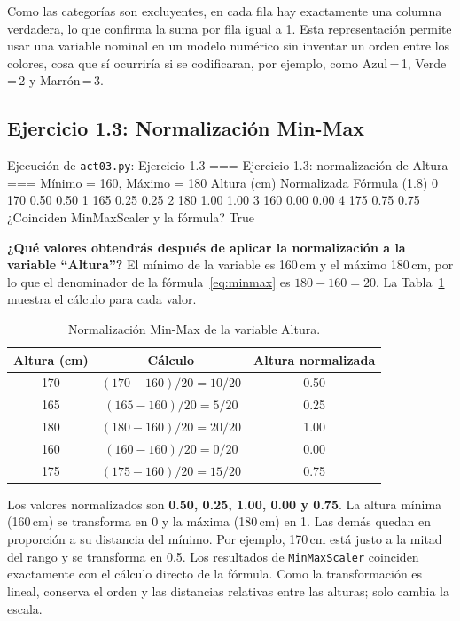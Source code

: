 \documentclass[11pt,letterpaper]{article}
\begin{document}
Como las categorías son excluyentes, en cada fila hay exactamente una columna verdadera, lo que confirma la suma por fila igual a 1. Esta representación permite usar una variable nominal en un modelo numérico sin inventar un orden entre los colores, cosa que sí ocurriría si se codificaran, por ejemplo, como Azul\,=\,1, Verde\,=\,2 y Marrón\,=\,3.

\subsection{Ejercicio 1.3: Normalización Min-Max}

\begin{consola}[label=out:ej13]{Ejecución de \texttt{act03.py}: Ejercicio 1.3}
=== Ejercicio 1.3: normalización de Altura ===
Mínimo = 160, Máximo = 180
   Altura (cm)  Normalizada  Fórmula (1.8)
0          170         0.50           0.50
1          165         0.25           0.25
2          180         1.00           1.00
3          160         0.00           0.00
4          175         0.75           0.75
¿Coinciden MinMaxScaler y la fórmula? True
\end{consola}

\textbf{¿Qué valores obtendrás después de aplicar la normalización a la variable ``Altura''?} El mínimo de la variable es 160\,cm y el máximo 180\,cm, por lo que el denominador de la fórmula~\eqref{eq:minmax} es $180 - 160 = 20$. La Tabla~\ref{tab:normalizacion} muestra el cálculo para cada valor.

\begin{table}[htbp]
\centering
\caption{Normalización Min-Max de la variable Altura.}
\label{tab:normalizacion}
\begin{tabular}{ccc}
\hline
\textbf{Altura (cm)} & \textbf{Cálculo} & \textbf{Altura normalizada} \\
\hline
170 & $(170 - 160) / 20 = 10 / 20$ & 0.50 \\
165 & $(165 - 160) / 20 = 5 / 20$  & 0.25 \\
180 & $(180 - 160) / 20 = 20 / 20$ & 1.00 \\
160 & $(160 - 160) / 20 = 0 / 20$  & 0.00 \\
175 & $(175 - 160) / 20 = 15 / 20$ & 0.75 \\
\hline
\end{tabular}
\end{table}

Los valores normalizados son \textbf{0.50, 0.25, 1.00, 0.00 y 0.75}. La altura mínima (160\,cm) se transforma en 0 y la máxima (180\,cm) en 1. Las demás quedan en proporción a su distancia del mínimo. Por ejemplo, 170\,cm está justo a la mitad del rango y se transforma en 0.5. Los resultados de \texttt{MinMaxScaler} coinciden exactamente con el cálculo directo de la fórmula. Como la transformación es lineal, conserva el orden y las distancias relativas entre las alturas; solo cambia la escala.
\end{document}
